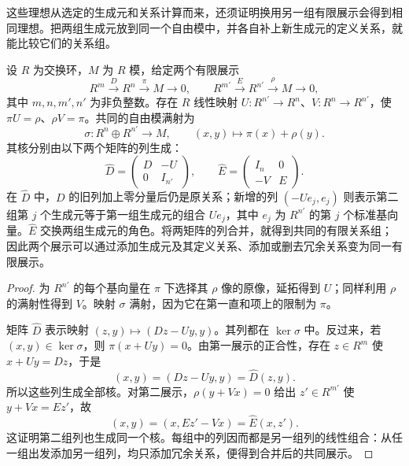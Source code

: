 这些理想从选定的生成元和关系计算而来，还须证明换用另一组有限展示会得到相同理想。把两组生成元放到同一个自由模中，并各自补上新生成元的定义关系，就能比较它们的关系组。

\begin{lemma}[有限展示的稳定化]\label{b3:lem:presentation-stabilization}
	设 \(R\) 为交换环，\(M\) 为 \(R\) 模，给定两个有限展示
	\[
		R^m\xrightarrow{D}R^n\xrightarrow{\pi}M\longrightarrow0, \qquad R^{m'}\xrightarrow{E}R^{n'}\xrightarrow{\rho}M\longrightarrow0,
	\]
	其中 \(m,n,m',n'\) 为非负整数。存在 \(R\) 线性映射 \(U:R^{n'}\rightarrow R^n\)、\(V:R^n\rightarrow R^{n'}\)，使 \(\pi U=\rho\)、\(\rho V=\pi\)。共同的自由模满射为
	\[
		\sigma:R^n\oplus R^{n'}\longrightarrow M, \qquad (x,y)\longmapsto\pi(x)+\rho(y).
	\]
	其核分别由以下两个矩阵的列生成：
	\[
		\widehat D=\begin{pmatrix}D&-U\\0&I_{n'}\end{pmatrix},
		\qquad
		\widehat E=\begin{pmatrix}I_n&0\\-V&E\end{pmatrix}.
	\]
	在 \(\widehat D\) 中，\(D\) 的旧列加上零分量后仍是原关系；新增的列 \((-Ue_j,e_j)\) 则表示第二组第 \(j\) 个生成元等于第一组生成元的组合 \(Ue_j\)，其中 \(e_j\) 为 \(R^{n'}\) 的第 \(j\) 个标准基向量。\(\widehat E\) 交换两组生成元的角色。将两矩阵的列合并，就得到共同的有限关系组；因此两个展示可以通过添加生成元及其定义关系、添加或删去冗余关系变为同一有限展示。
\end{lemma}
\begin{proof}
	为 \(R^{n'}\) 的每个基向量在 \(\pi\) 下选择其 \(\rho\) 像的原像，延拓得到 \(U\)；同样利用 \(\rho\) 的满射性得到 \(V\)。映射 \(\sigma\) 满射，因为它在第一直和项上的限制为 \(\pi\)。

	矩阵 \(\widehat D\) 表示映射 \((z,y)\mapsto(Dz-Uy,y)\)。其列都在 \(\ker\sigma\) 中。反过来，若 \((x,y)\in\ker\sigma\)，则 \(\pi(x+Uy)=0\)。由第一展示的正合性，存在 \(z\in R^m\) 使 \(x+Uy=Dz\)，于是
	\[
		(x,y)=(Dz-Uy,y)=\widehat D(z,y).
	\]
	所以这些列生成全部核。对第二展示，\(\rho(y+Vx)=0\) 给出 \(z'\in R^{m'}\) 使 \(y+Vx=Ez'\)，故
	\[
		(x,y)=(x,Ez'-Vx)=\widehat E(x,z').
	\]
	这证明第二组列也生成同一个核。每组中的列因而都是另一组列的线性组合：从任一组出发添加另一组列，均只添加冗余关系，便得到合并后的共同展示。
\end{proof}

